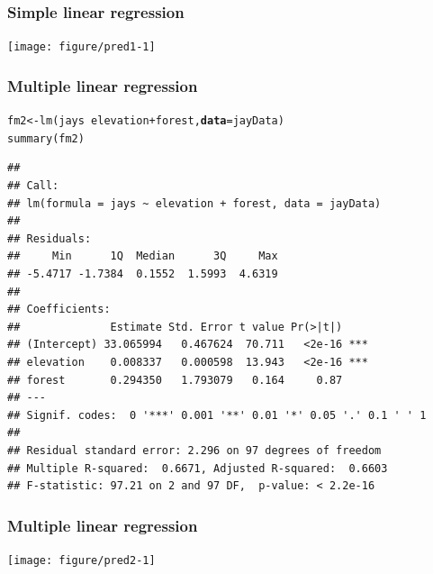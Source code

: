 \documentclass[color=usenames,dvipsnames]{beamer}\usepackage[]{graphicx}\usepackage[]{color}
\makeatletter
\newcommand{\hlopt}[1]{\textcolor[rgb]{0,0,0}{#1}}%
\newcommand{\hlstd}[1]{\textcolor[rgb]{0,0,0}{#1}}%
\newcommand{\hlkwb}[1]{\textcolor[rgb]{0,0.341,0.682}{#1}}%
\newcommand{\hlkwc}[1]{\textcolor[rgb]{0,0,0}{\textbf{#1}}}%
\newcommand{\hlkwd}[1]{\textcolor[rgb]{0.004,0.004,0.506}{#1}}%
\newenvironment{kframe}{%
 \def\at@end@of@kframe{}%
 \ifinner\ifhmode%
  \def\at@end@of@kframe{\end{minipage}}%
  \begin{minipage}{\columnwidth}%
 \fi\fi%
 \def\FrameCommand##1{\hskip\@totalleftmargin \hskip-\fboxsep
 \colorbox{shadecolor}{##1}\hskip-\fboxsep
     \hskip-\linewidth \hskip-\@totalleftmargin \hskip\columnwidth}%
 \MakeFramed {\advance\hsize-\width
   \@totalleftmargin\z@ \linewidth\hsize
   \@setminipage}}%
 {\par\unskip\endMakeFramed%
 \at@end@of@kframe}
\newenvironment{knitrout}{}{} %
\makeatother
\begin{document}
\begin{frame}[fragile]
  \frametitle{Simple linear regression}
\begin{knitrout}
\color{fgcolor}
\texttt{[image: figure/pred1-1]} 

\end{knitrout}
\end{frame}



\begin{frame}[fragile]
  \frametitle{Multiple linear regression}
\begin{knitrout}\scriptsize
{}\color{fgcolor}\begin{kframe}
\begin{alltt}
\hlstd{fm2} \hlkwb{<-} \hlkwd{lm}\hlstd{(jays} \hlopt{~} \hlstd{elevation}\hlopt{+}\hlstd{forest,} \hlkwc{data}\hlstd{=jayData)}
\hlkwd{summary}\hlstd{(fm2)}
\end{alltt}
\begin{verbatim}
## 
## Call:
## lm(formula = jays ~ elevation + forest, data = jayData)
## 
## Residuals:
##     Min      1Q  Median      3Q     Max 
## -5.4717 -1.7384  0.1552  1.5993  4.6319 
## 
## Coefficients:
##              Estimate Std. Error t value Pr(>|t|)    
## (Intercept) 33.065994   0.467624  70.711   <2e-16 ***
## elevation    0.008337   0.000598  13.943   <2e-16 ***
## forest       0.294350   1.793079   0.164     0.87    
## ---
## Signif. codes:  0 '***' 0.001 '**' 0.01 '*' 0.05 '.' 0.1 ' ' 1
## 
## Residual standard error: 2.296 on 97 degrees of freedom
## Multiple R-squared:  0.6671,	Adjusted R-squared:  0.6603 
## F-statistic: 97.21 on 2 and 97 DF,  p-value: < 2.2e-16
\end{verbatim}
\end{kframe}
\end{knitrout}
\end{frame}




\begin{frame}[fragile]
  \frametitle{Multiple linear regression}
\begin{knitrout}
\color{fgcolor}
\texttt{[image: figure/pred2-1]} 

\end{knitrout}
\end{frame}
\end{document}
